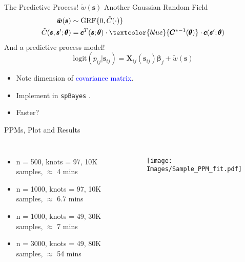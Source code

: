 \documentclass{beamer}
\begin{document}
\begin{frame}[fragile]{The Predictive Process! $\tilde{w}(\pmb{s})$}
Another Gaussian Random Field
\begin{align*}
\tilde{\pmb{w}}(\pmb{s}) &\sim \text{GRF}\{0, \tilde{C}(\cdot)\} \\
\tilde{C}(\pmb{s}, \pmb{s}'; \pmb{\theta}) &= \pmb{c}^{T}(\pmb{s};\pmb{\theta}) \cdot \textcolor{blue}{\pmb{C}^{*-1}(\pmb{\theta})} \cdot \pmb{c}(\pmb{s}';\pmb{\theta})
\end{align*}
And a predictive process model!
    \begin{equation}
    \text{logit}(p_{ij}|\pmb{s}_{ij}) = \pmb{X}_{ij}(\pmb{s}_{ij}) \pmb{\beta}_{j} + \tilde{w}(\pmb{s})
    \end{equation}
    \begin{itemize}
    \item Note dimension of \textcolor{blue}{covariance matrix}.
    \item Implement in \verb|spBayes| \citep{Finley2007}.
    \item Faster?
    \end{itemize}
\end{frame}

\begin{frame}{PPMs, Plot and Results}

\begin{columns}

      \begin{itemize}
      \addtolength{\itemsep}{0.5\baselineskip}
      \item n = 500, knots = 97, 10K samples, $\approx$ 4 mins
      \item n = 1000, knots = 97, 10K samples, $\approx$ 6.7 mins 
      \item n = 1000, knots = 49, 30K samples, $\approx$ 7 mins 
      \item n = 3000, knots = 49, 80K samples, $\approx$ 54 mins
      \end{itemize}

  \begin{figure}[H]
	\centering
	\texttt{[image: Images/Sample\_PPM\_fit.pdf]}
	\end{figure}

\end{columns}
\end{frame}
\end{document}
